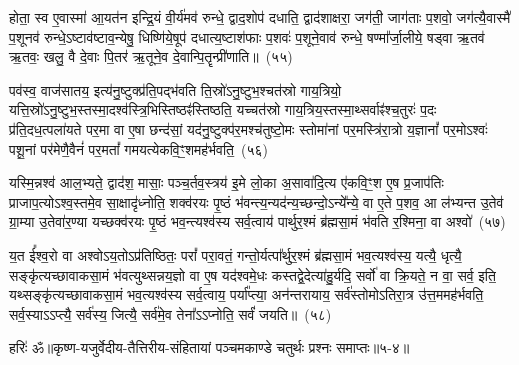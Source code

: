 होता॒ स्व ए॒वास्मा॑ आ॒यत॑न इन्द्रि॒यं वी॒र्य॑मव॑ रुन्धे॒ द्वाद॒शोप॑ दधाति॒ द्वाद॑शाक्षरा॒ जग॑ती॒ जाग॑ताः प॒शवो॒ जग॑त्यै॒वास्मै॑ प॒शूनव॑ रुन्धे॒\-ऽष्टाव॑ष्टाव॒न्येषु॒ धिष्णि॑ये॒षूप॑ दधात्य॒ष्टाश॑फाः प॒शवः॑ प॒शूने॒वाव॑ रुन्धे॒ षण्मा᳚र्जा॒लीये॒ षड्वा ऋ॒तव॑ ऋ॒तवः॒ खलु॒ वै दे॒वाः पि॒तर॑ ऋ॒तूने॒व दे॒वान्पि॒तॄन्प्री॑णाति॥~(५५)\ip

{}%

पव॑स्व॒ वाज॑सातय॒ इत्य॑नु॒ष्टुक्प्र॑ति॒पद्भ॑वति ति॒स्रो॑\-ऽनु॒ष्टुभ॒श्चत॑स्रो गाय॒त्रियो॒ यत्ति॒स्रो॑\-ऽनु॒ष्टुभ॒स्तस्मा॒दश्व॑स्त्रि॒भिस्तिष्ठꣴ॑स्तिष्ठति॒ यच्चत॑स्रो गाय॒त्रिय॒स्तस्मा॒थ्सर्वाꣴ॑श्च॒तुरः॑ प॒दः प्र॑ति॒दध॒त्\-पला॑यते पर॒मा वा ए॒षा छन्द॑सां॒ यद॑नु॒ष्टुक्प॑र॒मश्च॑तुष्टो॒मः स्तोमा॑नां पर॒मस्त्रि॑रा॒त्रो य॒ज्ञानां᳚ पर॒मो\-ऽश्वः॑ पशू॒नां पर॑मेणै॒वैनं॑ पर॒मतां᳚ गमयत्येकवि॒ꣳ॒शमह॑र्भवति॒~(५६)\ip

यस्मि॒न्नश्व॑ आल॒भ्यते॒ द्वाद॑श॒ मासाः॒ पञ्च॒र्तव॒स्त्रय॑ इ॒मे लो॒का अ॒सावा॑दि॒त्य ए॑कवि॒ꣳ॒श ए॒ष प्र॒जा\-प॑तिः प्राजाप॒त्यो\-ऽश्व॒स्तमे॒व सा॒क्षादृ॑ध्नोति॒ शक्व॑रयः पृ॒ष्ठं भ॑वन्त्य॒न्यद॑न्य॒च्छन्दो॒\-ऽन्ये᳚न्ये॒ वा ए॒ते प॒शव॒ आ ल॑भ्यन्त उ॒तेव॑ ग्रा॒म्या उ॒तेवा॑र॒ण्या यच्छक्व॑रयः पृ॒ष्ठं भव॒न्त्यश्व॑स्य सर्व॒त्वाय॑ पार्थुर॒श्मं ब्र॑ह्मसा॒मं भ॑वति र॒श्मिना॒ वा अश्वो॑~(५७)\ip

य॒त ई᳚श्व॒रो वा अश्वो\-ऽय॒तो\-ऽप्र॑तिष्ठितः॒ परां᳚ परा॒वतं॒ गन्तो॒र्यत्पा᳚र्थुर॒श्मं ब्र॑ह्मसा॒मं भव॒त्यश्व॑स्य॒ यत्यै॒ धृत्यै॒ सङ्कृ॑त्यच्छावाकसा॒मं भ॑वत्युथ्सन्नय॒ज्ञो वा ए॒ष यद॑श्वमे॒धः कस्तद्वे॒देत्या॑हु॒र्यदि॒ सर्वो॑ वा क्रि॒यते॒ न वा॒ सर्व॒ इति॒ यथ्सङ्कृ॑त्यच्छावाकसा॒मं भव॒त्यश्व॑स्य सर्व॒त्वाय॒ पर्या᳚प्त्या॒ अन॑न्तरायाय॒ सर्व॑स्तोमो\-ऽतिरा॒त्र उ॑त्त॒ममह॑र्भवति॒ सर्व॒स्या\-ऽऽप्त्यै॒ सर्व॑स्य॒ जित्यै॒ सर्व॑मे॒व तेना᳚\-ऽऽ\-प्नोति॒ सर्वं॑ जयति॥~(५८)\ip

{}%

{हरिः॑ ॐ}{॥कृष्ण-यजुर्वेदीय-तैत्तिरीय-संहितायां पञ्चमकाण्डे चतुर्थः प्रश्नः समाप्तः॥५-४॥}



